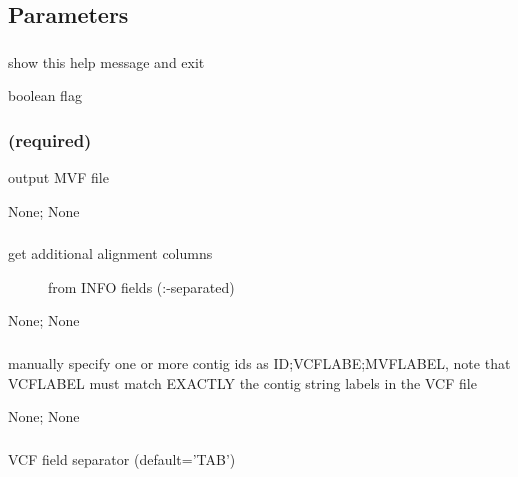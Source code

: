 \documentclass[letterpaper,11pt,english]{sphinxmanual}
\begin{document}
\subsection{Parameters}
\label{\detokenize{prog_desc:id32}}

\subsubsection{}
\label{\detokenize{prog_desc:id33}}
 show this help message and exit

 boolean flag


\subsubsection{ (required)}
\label{\detokenize{prog_desc:id34}}
 output MVF file

 None;  None


\subsubsection{}
\label{\detokenize{prog_desc:allelesfrom}}\begin{description}
\item[{ get additional alignment columns}] \leavevmode
from INFO fields (:-separated)

\end{description}

 None;  None


\subsubsection{}
\label{\detokenize{prog_desc:contigids}}
 manually specify one or more contig ids as ID;VCFLABE;MVFLABEL, note that VCFLABEL must match EXACTLY the contig string labels in the VCF file

 None;  None


\subsubsection{}
\label{\detokenize{prog_desc:fieldsep}}
 VCF field separator (default=’TAB’)
\end{document}
